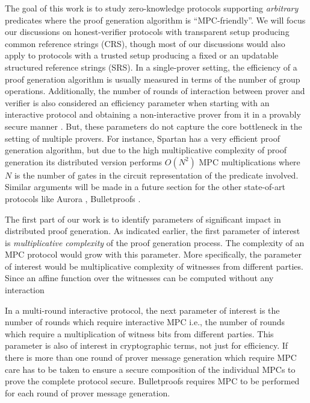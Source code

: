 The goal of this work is to study zero-knowledge protocols supporting \textit{arbitrary} predicates where the proof generation algorithm is ``MPC-friendly''. We will focus our discussions on honest-verifier protocols with transparent setup producing common reference strings (CRS), though most of our discussions would also apply to protocols with a trusted setup producing a fixed or an updatable structured reference strings (SRS).
In a single-prover setting, the efficiency of a proof generation algorithm is usually measured in terms of the number of group operations. Additionally, the number of rounds of interaction between prover and verifier is also considered an efficiency parameter when starting with an interactive protocol and obtaining a non-interactive prover from it in a provably secure manner \cite{BCS16}. But, these parameters do not capture the core bottleneck in the setting of multiple provers. For instance, Spartan \cite{spartan} has a very efficient proof generation algorithm, but due to the high multiplicative complexity of proof generation its distributed version performs $O(N^2)$ MPC multiplications where $N$ is the number of gates in the circuit representation of the predicate involved. Similar arguments will be made in a future section for the other state-of-art protocols like Aurora \cite{aurora}, Bulletproofs \cite{bulletproofs}.

The first part of our work is to identify parameters of significant impact in distributed proof generation. 
As indicated earlier, the first parameter of interest is \textit{multiplicative complexity} of the proof generation process. The complexity of an MPC protocol would grow with this parameter. More specifically, the parameter of interest would be multiplicative complexity of witnesses from different parties. Since an affine function over the witnesses can be computed without any interaction

In a multi-round interactive protocol, the next parameter of interest is the number of rounds which require interactive MPC i.e., the number of rounds which require a multiplication of witness bits from different parties. 
This parameter is also of interest in cryptographic terms, not just for efficiency. If there is more than one round of prover message generation which require MPC care has to be taken to ensure a secure composition of the individual MPCs to prove the complete protocol secure.
Bulletproofs \cite{bulletproofs} requires MPC to be performed for each round of prover message generation.

